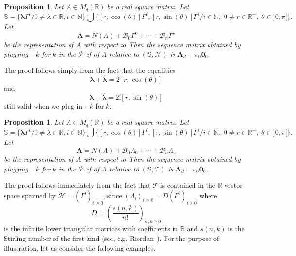 \documentclass[12pt]{amsart}
\newtheorem{prop}[thrm]{Proposition}
\theoremstyle{definition}
\numberwithin{equation}{section}
\numberwithin{equation}{section}
\begin{document}
\begin{prop}  Let $A\in M_{q}(\mathbb{R})$ be a real square matrix. Let
$$\mathbb{S}=\{\pmb{\lambda}\Gamma^{i}/0\neq \lambda\in \mathbb{R}, i\in \mathbb{N}\}\bigcup \{[r,\cos(\theta)]\Gamma^{i}, [r,\sin(\theta)]\Gamma^{i}/ i\in \mathbb{N},\,\,0\neq r\in \mathbb{R}^{+},\,\, \theta\in ]0,\pi[\}.$$
Let
$$\pmb{A}= N(A) + \mathcal{B}_{0}\Gamma^{0} + \cdots + \mathcal{B}_{n}\Gamma^{n}$$ be the representation of $A$ with respect to
Then the sequence matrix obtained by plugging $-k$ for $k$ in the $\mathcal{P}$-cf of $A$ relative to $(\mathbb{S}, \mathcal{H})$ is $\pmb{A}_{d}-\pi_{0}\pmb{0}_{0}$.
\end{prop}
\proof The proof follows simply from the fact that the equalities $$\pmb{\lambda}+\pmb{\overline{\lambda}}=2[r,\cos(\theta)]$$ and $$\pmb{\lambda}-\pmb{\overline{\lambda}}=2\mathrm{i}[r,\sin(\theta)]$$ still valid when we plug in $-k$ for $k$.
\endproof
\begin{prop}  Let $A\in M_{q}(\mathbb{R})$ be a real square matrix. Let
$$\mathbb{S}=\{\pmb{\lambda}\Gamma^{i}/0\neq \lambda\in \mathbb{R}, i\in \mathbb{N}\}\bigcup \{[r,\cos(\theta)]\Gamma^{i}, [r,\sin(\theta)]\Gamma^{i}/ i\in \mathbb{N},\,\,0\neq r\in \mathbb{R}^{+},\,\, \theta\in ]0,\pi[\}.$$
Let
$$\pmb{A}= N(A) + \mathcal{B}_{0}\Lambda_{0} + \cdots + \mathcal{B}_{n}\Lambda_{n}$$ be the representation of $A$ with respect to
Then the sequence matrix obtained by plugging $-k$ for $k$ in the $\mathcal{P}$-cf of $A$ relative to $(\mathbb{S}, \mathcal{T})$ is $\pmb{A}_{d}-\pi_{0}\pmb{0}_{0}$.
\end{prop}
\proof The proof follows immediately from the fact that $\mathcal{T}$ is contained in the $\mathbb{R}$-vector space spanned by $\mathcal{H}=(\Gamma^{i})_{i\geq 0}$, since $(\Lambda_{i})_{i\geq 0}=D(\Gamma^{i})_{i\geq 0}$ where
$$D=(\frac{s(n,k)}{n!})_{n,k\geqslant 0}$$ is the infinite lower triangular matrices with coefficients in $\mathbb{R}$ and $s(n,k)$ is the Stirling number of the first kind (see, e.g. Riordan~\cite{Riord}).
\endproof
For the purpose of illustration, let us consider the following examples.
\end{document}
